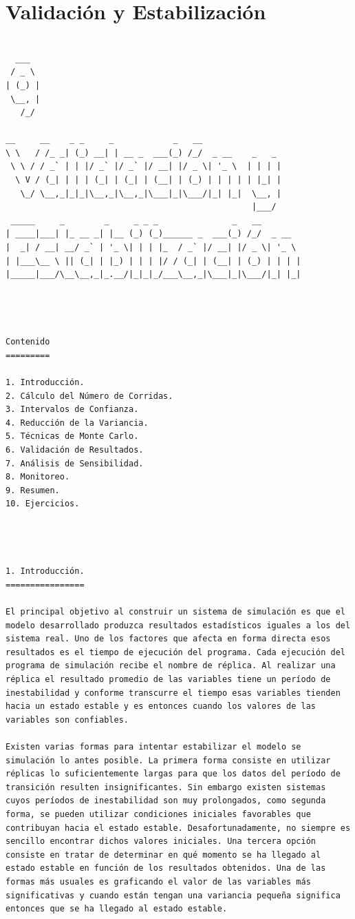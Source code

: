 \chapter{Validación y Estabilización}
\begin{verbatim}
    
  ___
 / _ \
| (_) |
 \__, |
   /_/

__     __    _ _     _            _   __
\ \   / /_ _| (_) __| | __ _  ___(_) /_/  _ __    _   _
 \ \ / / _` | | |/ _` |/ _` |/ __| |/ _ \| '_ \  | | | |
  \ V / (_| | | | (_| | (_| | (__| | (_) | | | | | |_| |
   \_/ \__,_|_|_|\__,_|\__,_|\___|_|\___/|_| |_|  \__, |
                                                  |___/
 _____     _        _     _ _ _               _   __
| ____|___| |_ __ _| |__ (_) (_)______ _  ___(_) /_/  _ __
|  _| / __| __/ _` | '_ \| | | |_  / _` |/ __| |/ _ \| '_ \
| |___\__ \ || (_| | |_) | | | |/ / (_| | (__| | (_) | | | |
|_____|___/\__\__,_|_.__/|_|_|_/___\__,_|\___|_|\___/|_| |_|




Contenido
=========

1. Introducción.
2. Cálculo del Número de Corridas.
3. Intervalos de Confianza.
4. Reducción de la Variancia.
5. Técnicas de Monte Carlo.
6. Validación de Resultados.
7. Análisis de Sensibilidad.
8. Monitoreo.
9. Resumen.
10. Ejercicios.




1. Introducción.
================

El principal objetivo al construir un sistema de simulación es que el modelo desarrollado produzca resultados estadísticos iguales a los del sistema real. Uno de los factores que afecta en forma directa esos resultados es el tiempo de ejecución del programa. Cada ejecución del programa de simulación recibe el nombre de réplica. Al realizar una réplica el resultado promedio de las variables tiene un período de inestabilidad y conforme transcurre el tiempo esas variables tienden hacia un estado estable y es entonces cuando los valores de las variables son confiables.

Existen varias formas para intentar estabilizar el modelo se simulación lo antes posible. La primera forma consiste en utilizar réplicas lo suficientemente largas para que los datos del período de transición resulten insignificantes. Sin embargo existen sistemas cuyos períodos de inestabilidad son muy prolongados, como segunda forma, se pueden utilizar condiciones iniciales favorables que contribuyan hacia el estado estable. Desafortunadamente, no siempre es sencillo encontrar dichos valores iniciales. Una tercera opción consiste en tratar de determinar en qué momento se ha llegado al estado estable en función de los resultados obtenidos. Una de las formas más usuales es graficando el valor de las variables más significativas y cuando están tengan una variancia pequeña significa entonces que se ha llegado al estado estable.





\end{verbatim}
